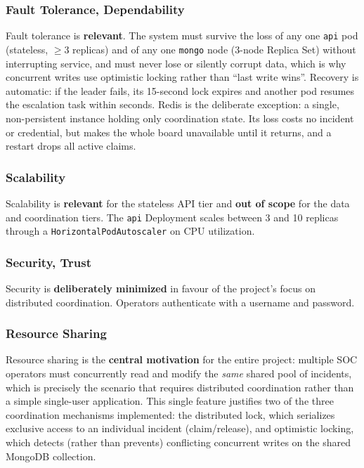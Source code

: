 \documentclass{scrartcl}
\begin{document}
\subsubsection{Fault Tolerance, Dependability}

Fault tolerance is \textbf{relevant}. The system must survive the loss of any one \texttt{api} pod (stateless, $\geq 3$ replicas) and of any one \texttt{mongo} node (3-node Replica Set) without interrupting service, and must never lose or silently corrupt data, which is why concurrent writes use optimistic locking rather than ``last write wins''. Recovery is automatic: if the leader fails, its 15-second lock expires and another pod resumes the escalation task within seconds. Redis is the deliberate exception: a single, non-persistent instance holding only coordination state. Its loss costs no incident or credential, but makes the whole board unavailable until it returns, and a restart drops all active claims.

\subsubsection{Scalability}

Scalability is \textbf{relevant} for the stateless API tier and \textbf{out of scope} for the data and coordination tiers. The \texttt{api} Deployment scales between 3 and 10 replicas through a \texttt{HorizontalPodAutoscaler} on CPU utilization. 

\subsubsection{Security, Trust}

Security is \textbf{deliberately minimized} in favour of the project's focus on distributed coordination. Operators authenticate with a username and password.

\subsubsection{Resource Sharing}

Resource sharing is the \textbf{central motivation} for the entire project: multiple SOC operators must concurrently read and modify the \emph{same} shared pool of incidents, which is precisely the scenario that requires distributed coordination rather than a simple single-user application. This single feature justifies two of the three coordination mechanisms implemented: the distributed lock, which serializes exclusive access to an individual incident (claim/release), and optimistic locking, which detects (rather than prevents) conflicting concurrent writes on the shared MongoDB collection.
\end{document}
